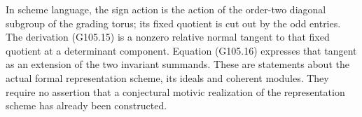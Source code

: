 In scheme language, the sign action is the action of
the order-two diagonal subgroup of the grading torus;
its fixed quotient is cut out by the odd entries.
The derivation (G105.15) is a nonzero relative normal
tangent to that fixed quotient at a determinant
component.  Equation (G105.16) expresses that tangent
as an extension of the two invariant summands.
These are statements about the actual formal
representation scheme, its ideals and coherent
modules.  They require no assertion that a conjectural
motivic realization of the representation scheme
has already been constructed.
